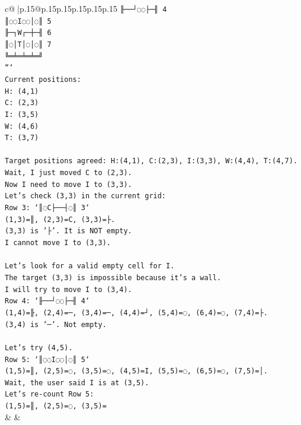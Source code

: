 \documentclass{article}
\begin{document}
{\begin{supertabular}{c@{$\;$}|p{.15\linewidth}@{}p{.15\linewidth}p{.15\linewidth}p{.15\linewidth}p{.15\linewidth}p{.15\linewidth}}
{{{\texttt{╟──┘◌◌├─╢ 4} \\
\texttt{║◌◌I◌◌│◌║ 5} \\
\texttt{╟─┐W┌─┼─╢ 6} \\
\texttt{║◌│T│◌│◌║ 7} \\
\texttt{╚═╧═╧═╧═╝} \\
\texttt{```} \\
\texttt{Current positions:} \\
\texttt{H: (4,1)} \\
\texttt{C: (2,3)} \\
\texttt{I: (3,5)} \\
\texttt{W: (4,6)} \\
\texttt{T: (3,7)} \\
\\ 
\texttt{Target positions agreed: H:(4,1), C:(2,3), I:(3,3), W:(4,4), T:(4,7).} \\
\texttt{Wait, I just moved C to (2,3).} \\
\texttt{Now I need to move I to (3,3).} \\
\texttt{Let's check (3,3) in the current grid:} \\
\texttt{Row 3: `║◌C├──┤◌║ 3`} \\
\texttt{(1,3)=║, (2,3)=C, (3,3)=├.} \\
\texttt{(3,3) is '├'. It is NOT empty.} \\
\texttt{I cannot move I to (3,3).} \\
\\ 
\texttt{Let's look for a valid empty cell for I.} \\
\texttt{The target (3,3) is impossible because it's a wall.} \\
\texttt{I will try to move I to (3,4).} \\
\texttt{Row 4: `╟──┘◌◌├─╢ 4`} \\
\texttt{(1,4)=╟, (2,4)=─, (3,4)=─, (4,4)=┘, (5,4)=◌, (6,4)=◌, (7,4)=├.} \\
\texttt{(3,4) is '─'. Not empty.} \\
\\ 
\texttt{Let's try (4,5).} \\
\texttt{Row 5: `║◌◌I◌◌│◌║ 5`} \\
\texttt{(1,5)=║, (2,5)=◌, (3,5)=◌, (4,5)=I, (5,5)=◌, (6,5)=◌, (7,5)=│.} \\
\texttt{Wait, the user said I is at (3,5).} \\
\texttt{Let's re{-}count Row 5:} \\
\texttt{(1,5)=║, (2,5)=◌, (3,5)=} \\
            }
        }
    }
    & & \\ \\


\end{supertabular}}
\end{document}
